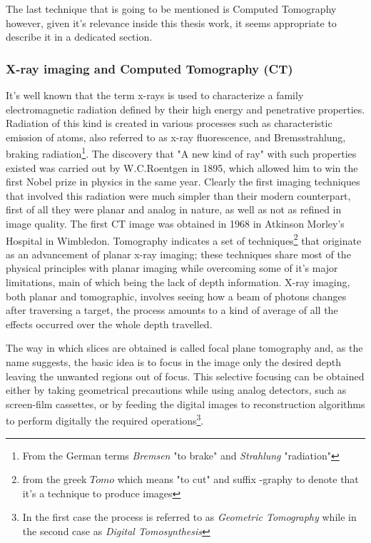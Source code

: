 The last technique that is going to be mentioned is Computed Tomography however, given it's relevance inside this thesis work, it seems appropriate to describe it in a dedicated section.

\subsubsection{X-ray imaging and Computed Tomography (CT)}
It's well known that the term x-rays is used to characterize a family electromagnetic radiation defined by their high energy and penetrative properties. Radiation of this kind is created in various processes such as characteristic emission of atoms, also referred to as x-ray fluorescence, and Bremsstrahlung, braking radiation\footnote{From the German terms \textit{Bremsen} "to brake" and \textit{Strahlung} "radiation"}. The discovery that "A new kind of ray"\cite{Roentgen} with such properties existed was carried out by W.C.Roentgen in 1895, which allowed him to win the first Nobel prize in physics in the same year. Clearly the first imaging techniques that involved this radiation were much simpler than their modern counterpart, first of all they were planar and analog in nature, as well as not as refined in image quality. The first CT image was obtained in 1968 in Atkinson Morley's Hospital in Wimbledon. Tomography indicates a set of techniques\footnote{from the greek $\textit{Tomo}$ which means "to cut" and suffix -graphy to denote that it's a technique to produce images} that originate as an advancement of planar x-ray imaging; these techniques share most of the physical principles with planar imaging while overcoming some of it's major limitations, main of which being the lack of depth information.  X-ray imaging, both planar and tomographic, involves seeing how a beam of photons changes after traversing a target, the process amounts to a kind of average of all the effects occurred over the whole depth travelled.

The way in which slices are obtained is called focal plane tomography and, as the name suggests, the basic idea is to focus in the image only the desired depth leaving the unwanted regions out of focus. This selective focusing can be obtained either by taking geometrical precautions while using analog detectors, such as screen-film cassettes, or by feeding the digital images to reconstruction algorithms to perform digitally the required operations\footnote{In the first case the process is referred to as \textit{Geometric Tomography} while in the second case as \textit{Digital Tomosynthesis}}.


